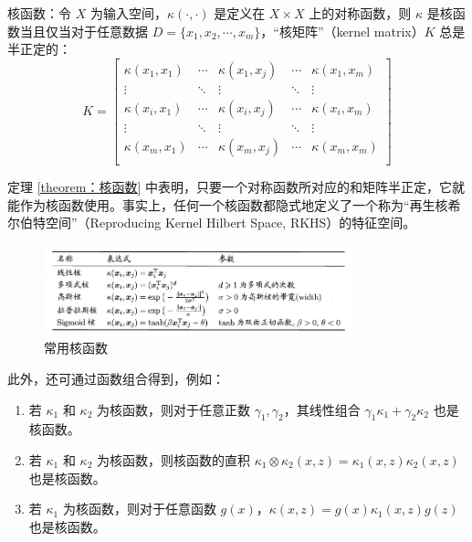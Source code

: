 \documentclass[12pt, a4paper]{article} %
\begin{document}
\begin{theorem}\label{theorem：核函数}
    核函数：令 $X$ 为输入空间，$\kappa (\cdot, \cdot)$ 是定义在 $X \times X$ 上的对称函数，则 $\kappa$ 是核函数当且仅当对于任意数据 $D = \{x_1, x_2,\cdots, x_m\}$，“核矩阵”（kernel matrix）$K$ 总是半正定的：
    \begin{equation*}
        K = \left[ {\begin{array}{*{20}{c}}
                        \kappa (x_1, x_1) & \cdots & \kappa(x_1, x_j)  & \cdots & \kappa(x_1, x_m) \\
                        \vdots            & \ddots & \vdots            & \ddots & \vdots           \\
                        \kappa (x_i, x_1) & \cdots & \kappa(x_i, x_j)  & \cdots & \kappa(x_i, x_m) \\
                        \vdots            & \ddots & \vdots            & \ddots & \vdots           \\
                        \kappa (x_m, x_1) & \cdots & \kappa (x_m, x_j) & \cdots & \kappa(x_m, x_m) \\
                    \end{array}} \right]
    \end{equation*}
\end{theorem}

定理 \ref{theorem：核函数} 中表明，只要一个对称函数所对应的和矩阵半正定，它就能作为核函数使用。事实上，任何一个核函数都隐式地定义了一个称为“再生核希尔伯特空间”（Reproducing Kernel Hilbert Space, RKHS）的特征空间。

\begin{figure}[H]
    \centering
    \includegraphics[width=0.8\textwidth]{../img/6-4-常用核函数.png}
    \caption{常用核函数}
    \label{fig:常用核函数}
\end{figure}

此外，还可通过函数组合得到，例如：
\begin{enumerate}[\hspace*{2em} i.]
    \item 若 $\kappa_1$ 和 $\kappa_2$ 为核函数，则对于任意正数 $\gamma_1, \gamma_2$，其线性组合 $\gamma_1 \kappa_1 + \gamma_2 \kappa_2$ 也是核函数。
    \item 若 $\kappa_1$ 和 $\kappa_2$ 为核函数，则核函数的直积 $\kappa_1 \otimes \kappa_2 (x, z) = \kappa_1 (x, z) \kappa_2 (x, z)$ 也是核函数。
    \item 若 $\kappa_1$ 为核函数，则对于任意函数 $g(x)$，$\kappa (x, z) = g(x) \kappa_1 (x, z) g(z)$ 也是核函数。
\end{enumerate}
\end{document}
